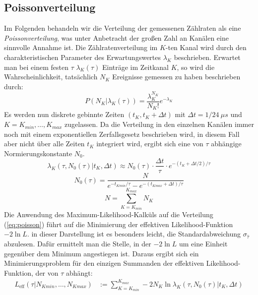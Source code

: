 	\subsection{Poissonverteilung}\label{sec:poisson}
		Im Folgenden behandeln wir die Verteilung der gemessenen Zählraten als eine \textit{Poissonverteilung}, was unter Anbetracht der großen Zahl an Kanälen eine sinnvolle Annahme ist. Die Zählratenverteilung im $K$-ten Kanal wird durch den charakteristischen Parameter des Erwartungswertes $\lambda_K$ beschrieben. Erwartet man bei einem festen $\tau$ $\lambda_K(\tau)$ Einträge im Zeitkanal $K$, so wird die Wahrscheinlichkeit, tatsächlich $N_K$ Ereignisse gemessen zu haben beschrieben durch:
			\begin{equation} \label{eq:poisson}
				P(N_K|\lambda_K(\tau)) = \frac{\lambda_K^{N_K}}{N_K!}e^{-\lambda_K}
			\end{equation}
		Es werden nun diskrete gebinnte Zeiten $(t_K, t_K + \Delta t)$ mit $\Delta t = 1/24\ \unit{\mu s}$ und $K = K_{min},\dots,K_{max}$ zugelassen. Da die Verteilung in den einzelnen Kanälen immer noch mit einem exponentiellen Zerfallsgesetz beschrieben wird, in diesem Fall aber nicht über alle Zeiten $t_K$ integriert wird, ergibt sich eine von $\tau$ abhängige Normierungskonstante $N_0$.
			\begin{equation}\label{eq:lamdbda}
				\lambda_K(\tau,N_0(\tau)|t_K,\Delta t) \approx N_0(\tau)\cdot \frac{\Delta t}{\tau} \cdot e^{-(t_K+\Delta t/2)/\tau}
			\end{equation} 
			\begin{equation}
				N_0(\tau) = \frac{N}{e^{-t_{Kmin}/\tau}-e^{-(t_{Kmax}+\Delta t)/\tau}}	
			\end{equation} 
			\begin{equation}\label{eq:N}
				N = \sum_{K = K_{min}}^{K_{max}} N_K	
			\end{equation} 
		Die Anwendung des Maximum-Likelihood-Kalküls auf die Verteilung (\ref{eq:poisson}) führt auf die Minimierung der effektiven Likelihood-Funktion $-2\ln L$. in dieser Darstellung ist es besonders leicht, die Standardabweichung $\sigma_{\hat{\tau}}$ abzulesen. Dafür ermittelt man die Stelle, in der $-2 \ln L$ um eine Einheit gegenüber dem Minimum angestiegen ist. Daraus ergibt sich ein Minimierungsproblem für den einzigen Summanden der effektiven Likelihood-Funktion, der von $\tau$ abhängt:
			\begin{align}
				L_{\text{eff}}(\tau|N_{Kmin},\dots,N_{Kmax}) &:=  \sum_{K = K_{min}}^{K_{max}} -2 N_K \ln\lambda_K(\tau, N_0(\tau)|t_K,\Delta t)	
			\end{align} 
